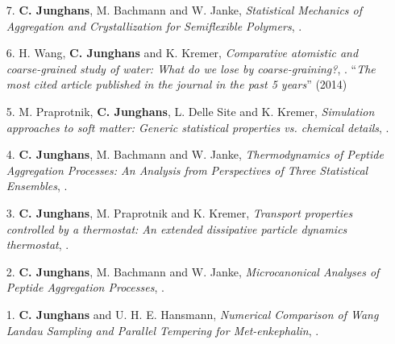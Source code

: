 \documentclass{article}
\begin{document}
\begin{enumerate}
\item[7.] \textbf{C. Junghans}, M. Bachmann and W. Janke,
  \textit{Statistical Mechanics of Aggregation and Crystallization for Semiflexible Polymers},
  .

\item[6.] H. Wang, \textbf{C. Junghans} and K. Kremer,
  \textit{Comparative atomistic and coarse-grained study of water: What do we lose by coarse-graining?},
  . 
  ``\emph{The most cited article published in the journal in the past 5 years}'' (2014)

\item[5.] M. Praprotnik, \textbf{C. Junghans}, L. Delle Site and K. Kremer,
  \textit{Simulation approaches to soft matter: Generic statistical properties vs. chemical details},
  .

\item[4.] \textbf{C. Junghans}, M. Bachmann and W. Janke,
  \textit{Thermodynamics of Peptide Aggregation Processes: An Analysis from Perspectives of Three Statistical Ensembles},
   .

\item[3.] \textbf{C. Junghans}, M. Praprotnik and K. Kremer,
  \textit{Transport properties controlled by a thermostat: An extended dissipative particle dynamics thermostat},
  .

\item[2.] \textbf{C. Junghans}, M. Bachmann and W. Janke,
  \textit{Microcanonical Analyses of Peptide Aggregation Processes},
  .

\item[1.] \textbf{C. Junghans} and U. H. E. Hansmann,
  \textit{Numerical Comparison of Wang Landau Sampling and Parallel Tempering for Met-enkephalin}, 
  .
\end{enumerate}
\end{document}
